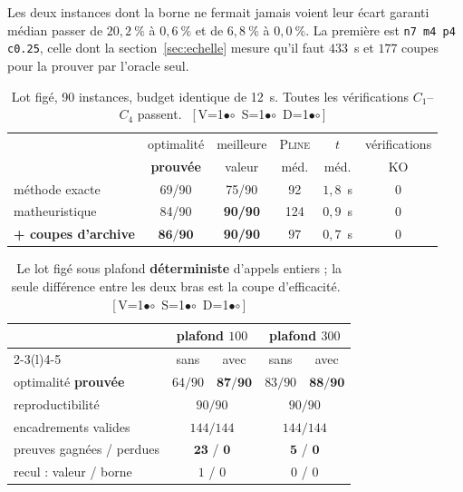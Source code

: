 \documentclass[11pt,a4paper]{article}
\theoremstyle{plain}
\theoremstyle{remark}
\newcommand{\ILP}{\textsc{Pline}}
\newcommand{\cfgm}[1]{\ifnum#1=1$\bullet$\else$\circ$\fi}
\newcommand{\conf}[3]{%
  \textsf{\footnotesize[\,V\cfgm{#1}\ S\cfgm{#2}\ D\cfgm{#3}\,]}}
\begin{document}
\noindent
Les deux instances dont la borne ne fermait jamais voient leur écart garanti
médian passer de $20{,}2\ \%$ à $0{,}6\ \%$ et de $6{,}8\ \%$ à
$0{,}0\ \%$. La première est \texttt{n7 m4 p4 c0.25}, celle dont la
section~\ref{sec:echelle} mesure qu'il faut $433$~s et $177$ coupes pour la
prouver par l'oracle seul.

\begin{table}[H]
\centering
\caption{Lot figé, 90 instances, budget identique de 12~s. Toutes les
vérifications $C_1$--$C_4$ passent.\ \conf{0}{0}{0}}
\label{tab:archlot}
\setlength{\tabcolsep}{5pt}
\begin{tabular}{lccccc}
\toprule
& optimalité & meilleure & \ILP & $t$ & vérifications\\
& \textbf{prouvée} & valeur & méd. & méd. & KO\\
\midrule
méthode exacte & 69/90 & 75/90 & 92 & $1{,}8$~s & 0\\
matheuristique & 84/90 & \textbf{90/90} & 124 & $0{,}9$~s & 0\\
\textbf{+ coupes d'archive} & $\mathbf{86/90}$ & \textbf{90/90}
 & $97$ & $0{,}7$~s & 0\\
\bottomrule
\end{tabular}
\end{table}


\begin{table}[H]
\centering
\caption{Le lot figé sous plafond \textbf{déterministe} d'appels entiers ;
la seule différence entre les deux bras est la coupe d'efficacité.\
\conf{1}{1}{1}}
\label{tab:lotdeterm}
\setlength{\tabcolsep}{6pt}
\begin{tabular}{lcccc}
\toprule
& \multicolumn{2}{c}{plafond $100$} & \multicolumn{2}{c}{plafond $300$}\\
\cmidrule(lr){2-3}\cmidrule(l){4-5}
& sans & avec & sans & avec\\
\midrule
optimalité \textbf{prouvée} & $64/90$ & $\mathbf{87/90}$
                            & $83/90$ & $\mathbf{88/90}$\\
reproductibilité & \multicolumn{2}{c}{$90/90$} & \multicolumn{2}{c}{$90/90$}\\
encadrements valides & \multicolumn{2}{c}{$144/144$}
                     & \multicolumn{2}{c}{$144/144$}\\
\midrule
preuves gagnées / perdues & \multicolumn{2}{c}{$\mathbf{23}$ / $\mathbf{0}$}
                          & \multicolumn{2}{c}{$\mathbf{5}$ / $\mathbf{0}$}\\
recul : valeur / borne & \multicolumn{2}{c}{$1$ / $0$}
                       & \multicolumn{2}{c}{$0$ / $0$}\\
\bottomrule
\end{tabular}
\end{table}
\end{document}
